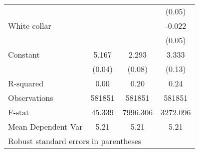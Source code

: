 {\begin{tabular}{l*{3}{c}}
                    &                     &                     &      (0.05)         \\
White collar        &                     &                     &      -0.022         \\
                    &                     &                     &      (0.05)         \\
Constant            &       5.167\sym{***}&       2.293\sym{***}&       3.333\sym{***}\\
                    &      (0.04)         &      (0.08)         &      (0.13)         \\
\hline
R-squared           &        0.00         &        0.20         &        0.24         \\
Observations        &      581851         &      581851         &      581851         \\
F-stat              &      45.339         &    7996.306         &    3272.096         \\
Mean Dependent Var  &        5.21         &        5.21         &        5.21         \\
\hline\hline
\multicolumn{4}{l}{\footnotesize Robust standard errors in parentheses}\\
\end{tabular}
}

